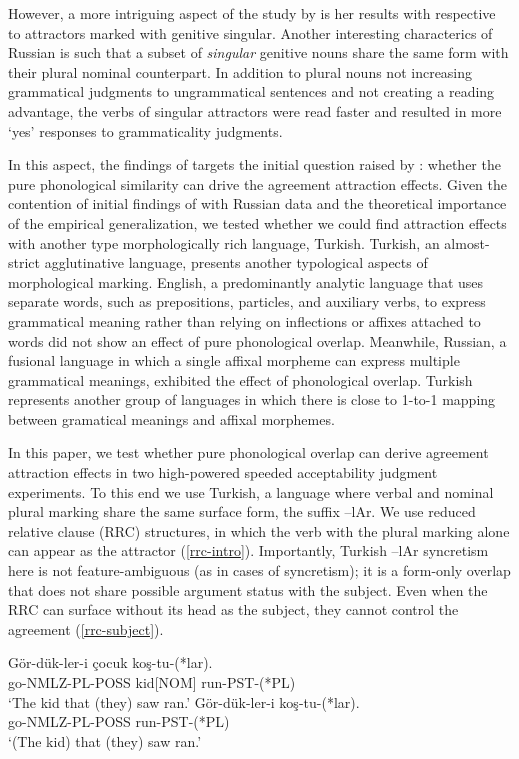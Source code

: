 \documentclass[
  authoryear,
  3p]{elsarticle}
\begin{document}
However, a more intriguing aspect of the study by \citet{Slioussar2018}
is her results with respective to attractors marked with genitive
singular. Another interesting characterics of Russian is such that a
subset of \emph{singular} genitive nouns share the same form with their
plural nominal counterpart. In addition to plural nouns not increasing
grammatical judgments to ungrammatical sentences and not creating a
reading advantage, the verbs of singular attractors were read faster and
resulted in more `yes' responses to grammaticality judgments.

In this aspect, the findings of \citet{Slioussar2018} targets the
initial question raised by \citet{BockEberhard1993}: whether the pure
phonological similarity can drive the agreement attraction effects.
Given the contention of initial findings of \citet{BockEberhard1993}
with Russian data and the theoretical importance of the empirical
generalization, we tested whether we could find attraction effects with
another type morphologically rich language, Turkish. Turkish, an
almost-strict agglutinative language, presents another typological
aspects of morphological marking. English, a predominantly analytic
language that uses separate words, such as prepositions, particles, and
auxiliary verbs, to express grammatical meaning rather than relying on
inflections or affixes attached to words did not show an effect of pure
phonological overlap. Meanwhile, Russian, a fusional language in which a
single affixal morpheme can express multiple grammatical meanings,
exhibited the effect of phonological overlap. Turkish represents another
group of languages in which there is close to 1-to-1 mapping between
gramatical meanings and affixal morphemes.

In this paper, we test whether pure phonological overlap can derive
agreement attraction effects in two high-powered speeded acceptability
judgment experiments. To this end we use Turkish, a language where
verbal and nominal plural marking share the same surface form, the
suffix --lAr. We use reduced relative clause (RRC) structures, in which
the verb with the plural marking alone can appear as the attractor
(\ref{rrc-intro}). Importantly, Turkish --lAr syncretism here is not
feature-ambiguous (as in cases of syncretism); it is a form-only overlap
that does not share possible argument status with the subject. Even when
the RRC can surface without its head as the subject, they cannot control
the agreement (\ref{rrc-subject}).

\begin{exe}
\ex \label{rrc-intro}
\gll Gör-dük-ler-i çocuk koş-tu-(*lar).\\
go-NMLZ-PL-POSS kid[NOM] run-PST-(*PL)\\
\glt `The kid that (they) saw ran.'
\ex \label{rrc-subject}
\gll Gör-dük-ler-i koş-tu-(*lar).\\
go-NMLZ-PL-POSS run-PST-(*PL)\\
\glt `(The kid) that (they) saw ran.'
\end{exe}
\end{document}
